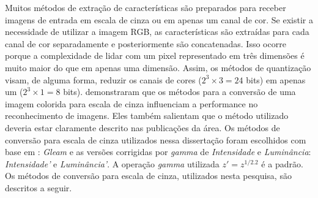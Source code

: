Muitos métodos de extração de características são preparados para receber imagens de entrada em escala de cinza ou em apenas um canal de cor. Se existir a necessidade de utilizar a imagem RGB, as características são extraídas para cada canal de cor separadamente e posteriormente são concatenadas. Isso ocorre porque a complexidade de lidar com um pixel representado em três dimensões é muito maior do que em apenas uma dimensão. Assim, os métodos de quantização visam, de alguma forma, reduzir os canais de cores ($2^{3} \times 3 = 24$ bits) em apenas um ($2^{3} \times 1 = 8$ bits).  demonstraram que os métodos para a conversão de uma imagem colorida para escala de cinza influenciam a performance no reconhecimento de imagens. Eles também salientam que o método utilizado deveria estar claramente descrito nas publicações da área. Os métodos de conversão para escala de cinza utilizados nessa dissertação foram escolhidos com base em : \emph{Gleam} e as versões corrigidas por \textit{gamma} de \emph{Intensidade} e \emph{Luminância}: \emph{Intensidade'} e \emph{Luminância'}. A operação \textit{gamma} utilizada $z' = z^{1/2.2}$ é a padrão. Os métodos de conversão para escala de cinza, utilizados nesta pesquisa, são descritos a seguir.

